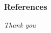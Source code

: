 \documentclass{beamer}
\begin{document}
\begin{frame}
  \frametitle{References}
  \printbibliography
\end{frame}

\begin{frame}{}
  \centering \Large
  \emph{Thank you}
\end{frame}



\end{document}
